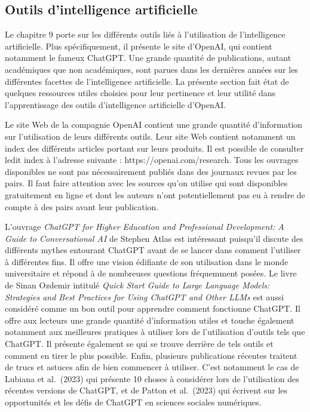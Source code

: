 \documentclass[
  letterpaper,
  DIV=11,
  numbers=noendperiod]{scrreprt}
\begin{document}
\hypertarget{outils-dintelligence-artificielle}{%
\subsection{Outils d'intelligence
artificielle}\label{outils-dintelligence-artificielle}}

Le chapitre 9 porte sur les différents outils liés à l'utilisation de
l'intelligence artificielle. Plus spécifiquement, il présente le site
d'OpenAI, qui contient notamment le fameux ChatGPT. Une grande quantité
de publications, autant académiques que non académiques, sont parues
dans les dernières années sur les différentes facettes de l'intelligence
artificielle. La présente section fait état de quelques ressources
utiles choisies pour leur pertinence et leur utilité dans
l'apprentissage des outils d'intelligence artificielle d'OpenAI.

Le site Web de la compagnie OpenAI contient une grande quantité
d'information sur l'utilisation de leurs différents outils. Leur site
Web contient notamment un index des différents articles portant sur
leurs produits. Il est possible de consulter ledit index à l'adresse
suivante : https://openai.com/research. Tous les ouvrages disponibles ne
sont pas nécessairement publiés dans des journaux revues par les pairs.
Il faut faire attention avec les sources qu'on utilise qui sont
disponibles gratuitement en ligne et dont les auteurs n'ont
potentiellement pas eu à rendre de compte à des pairs avant leur
publication.

L'ouvrage \emph{ChatGPT for Higher Education and Professional
Development: A Guide to Conversational AI} de Stephen Atlas est
intéressant puisqu'il discute des différents mythes entourant ChatGPT
avant de se lancer dans comment l'utiliser à différentes fins. Il offre
une vision édifiante de son utilisation dans le monde universitaire et
répond à de nombreuses questions fréquemment posées. Le livre de Sinan
Ozdemir intitulé \emph{Quick Start Guide to Large Language Models:
Strategies and Best Practices for Using ChatGPT and Other LLMs} est
aussi considéré comme un bon outil pour apprendre comment fonctionne
ChatGPT. Il offre aux lecteurs une grande quantité d'information utiles
et touche également notamment aux meilleures pratiques à utiliser lors
de l'utilisation d'outils tels que ChatGPT. Il présente également se qui
se trouve derrière de tels outils et comment en tirer le plus possible.
Enfin, plusieurs publications récentes traitent de trucs et astuces afin
de bien commencer à utiliser. C'est notamment le cas de Lubiana et
al.~(2023) qui présente 10 choses à considérer lors de l'utilisation des
récentes versions de ChatGPT, et de Patton et al.~(2023) qui écrivent
sur les opportunités et les défis de ChatGPT en sciences sociales
numériques.
\end{document}
